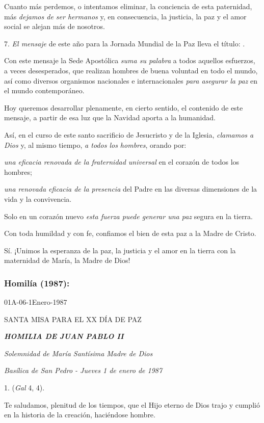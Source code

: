 \begin{body}
	Cuanto más perdemos, o intentamos eliminar, la conciencia de esta paternidad, más \emph{dejamos de ser hermanos} y, en consecuencia, la justicia, la paz y el amor social se alejan más de nosotros.

	7. \emph{El mensaje} de este año para la Jornada Mundial de la Paz lleva el título: .

	Con este mensaje la Sede Apostólica \emph{suma su palabra} a todos aquellos esfuerzos, a veces desesperados, que realizan hombres de buena voluntad en todo el mundo, así como diversos organismos nacionales e internacionales \emph{para asegurar la paz} en el mundo contemporáneo.

	Hoy queremos desarrollar plenamente, en cierto sentido, el contenido de este mensaje, a partir de esa luz que la Navidad aporta a la humanidad.

	Así, en el curso de este santo sacrificio de Jesucristo y de la Iglesia, \emph{clamamos a Dios} y, al mismo tiempo, \emph{a todos los hombres}, orando por:

	\emph{una eficacia renovada de la fraternidad universal} en el corazón de todos los hombres;

	\emph{una renovada eficacia de la presencia} del Padre en las diversas dimensiones de la vida y la convivencia.

	Solo en un corazón nuevo \emph{esta fuerza puede generar una paz} segura en la tierra.

	Con toda humildad y con fe, confiamos el bien de esta paz a la Madre de Cristo.

	Sí. ¡Unimos la esperanza de la paz, la justicia y el amor en la tierra con la maternidad de María, la Madre de Dios!

	\subsubsection{Homilía (1987):} 01A-06-1Enero-1987

	SANTA MISA PARA EL XX DÍA DE PAZ

	\emph{\textbf{HOMILIA DE JUAN PABLO II}}

	\emph{Solemnidad de María Santísima Madre de Dios}

	\emph{Basílica de San Pedro - Jueves 1 de enero de 1987}

	1.  (\emph{Gal} 4, 4).

	Te saludamos, plenitud de los tiempos, que el Hijo eterno de Dios trajo y cumplió en la historia de la creación, haciéndose hombre.


\end{body}
